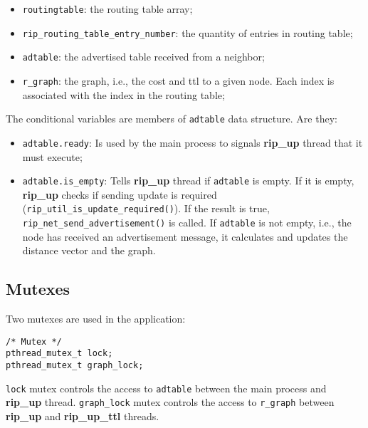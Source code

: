\documentclass[10pt]{extarticle}
\begin{document}
\begin{itemize}
\item{\texttt{routingtable}:} the routing table array;
\item{\texttt{rip\_routing\_table\_entry\_number}:} the quantity of entries in
  routing table;
\item{\texttt{adtable}:} the advertised table received from a neighbor;
\item{\texttt{r\_graph}:} the graph, i.e., the cost and ttl to a given
  node. Each index is associated with the index in the routing table;
\end{itemize}

The conditional variables are members of \texttt{adtable} data structure. Are
they:

\begin{itemize}
\item{\texttt{adtable.ready}:} Is used by the main process to signals
  \textbf{rip\_up} thread that it must execute;
\item{\texttt{adtable.is\_empty}:} Tells \textbf{rip\_up} thread if
  \texttt{adtable} is empty. If it is empty, \textbf{rip\_up} checks if sending update
is required (\texttt{rip\_util\_is\_update\_required()}). If the result is true, 
\texttt{rip\_net\_send\_advertisement()} is called. If \texttt{adtable} is not
empty,
i.e., the node has received an advertisement message, it calculates and updates
the distance vector and the graph.
\end{itemize}

\subsection{Mutexes}

Two mutexes are used in the application:

\begin{lstlisting}
/* Mutex */
pthread_mutex_t lock;
pthread_mutex_t graph_lock;
\end{lstlisting}

\texttt{lock} mutex controls the access to \texttt{adtable} between the main
process and \textbf{rip\_up} thread. \texttt{graph\_lock} mutex controls the
access to \texttt{r\_graph} between \textbf{rip\_up} and \textbf{rip\_up\_ttl}
threads.
\end{document}
